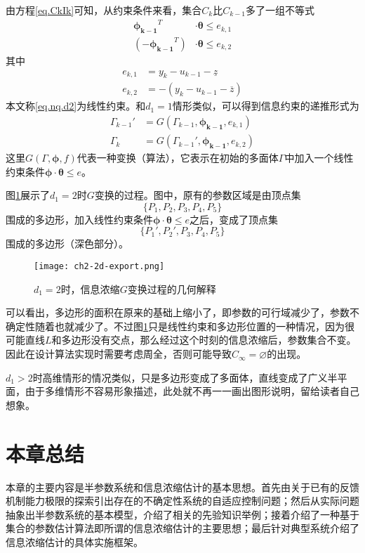 由方程\eqref{eq.CkIk}可知，从约束条件来看，集合$C_{k}$比$C_{k-1}$多了一组不等式
\begin{equation}%
\label{eq.nq.d2}
\begin{split}%
\bm{\phi_{k-1}}^{T}&\cdot\bm{\theta}\leq e_{k,1}\\
(-\bm{\phi_{k-1}}^{T})&\cdot\bm{\theta}\leq e_{k,2}
\end{split}
\end{equation}
其中
\begin{equation}%
\label{eq.fk}
\begin{split}%
e_{k,1}&=y_{k}-u_{k-1}-\underline{z}\\
e_{k,2}&=-(y_{k}-u_{k-1}-\overline{z})
\end{split}
\end{equation}
本文称\eqref{eq.nq.d2}为线性约束。和$d_{1}=1$情形类似，可以得到信息约束的递推形式为
\begin{equation}%
\begin{split}%
\Gamma_{k-1}'&=G(\Gamma_{k-1},\bm{\phi_{k-1}},e_{k,1})\\
\Gamma_{k}&=G(\Gamma_{k-1}',\bm{\phi_{k-1}},e_{k,2})
\end{split}
\end{equation}
这里$G(\Gamma,\bm{\phi},f)$代表一种变换（算法），它表示在初始的多面体$\Gamma$中加入一个线性约束条件$\bm{\phi}\cdot\bm{\theta}\leq e$。

图\ref{fig.2d.export}展示了$d_{1}=2$时$G$变换的过程。图中，原有的参数区域是由顶点集
\begin{equation}%
\{P_{1},P_{2},P_{3},P_{4},P_{5}\}
\end{equation}
围成的多边形，加入线性约束条件$\bm{\phi}\cdot\bm{\theta}\leq e$之后，变成了顶点集
\begin{equation}%
\{P_{1}',P_{2}',P_{3},P_{4},P_{5}\}
\end{equation}
围成的多边形（深色部分）。

\begin{figure}[htb]
	\centering
	\texttt{[image: ch2-2d-export.png]}\\	 %
	\caption{$d_{1}=2$时，信息浓缩$G$变换过程的几何解释}
	\label{fig.2d.export}
\end{figure}

可以看出，多边形的面积在原来的基础上缩小了，即参数的可行域减少了，参数不确定性随着也就减少了。不过图\ref{fig.2d.export}只是线性约束和多边形位置的一种情况，因为很可能直线$L$和多边形没有交点，那么经过这个时刻的信息浓缩后，参数集合不变。因此在设计算法实现时需要考虑周全，否则可能导致$C_{\infty}=\varnothing$的出现。

$d_{1}>2$时高维情形的情况类似，只是多边形变成了多面体，直线变成了广义半平面，由于多维情形不容易形象描述，此处就不再一一画出图形说明，留给读者自己想象。

\section{本章总结}
本章的主要内容是半参数系统和信息浓缩估计的基本思想。首先由关于已有的反馈机制能力极限的探索引出存在的不确定性系统的自适应控制问题；然后从实际问题抽象出半参数系统的基本模型，介绍了相关的先验知识举例；接着介绍了一种基于集合的参数估计算法即所谓的信息浓缩估计的主要思想；最后针对典型系统介绍了信息浓缩估计的具体实施框架。